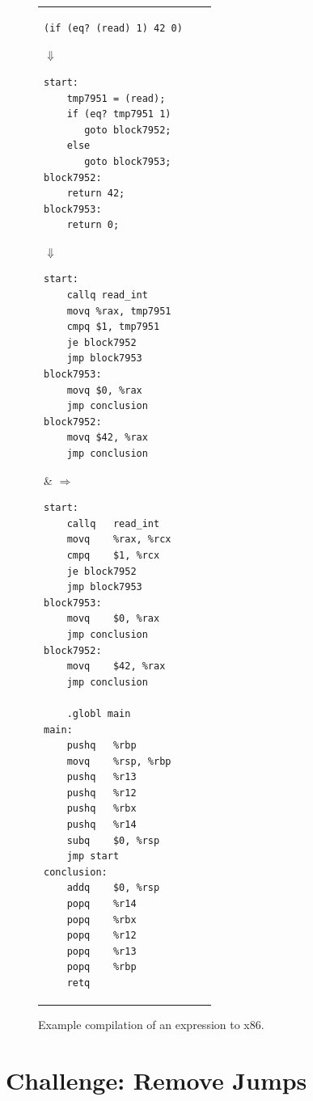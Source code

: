 \documentclass[11pt]{book}
\newcommand{\ocaml}[1]{{\color{blue}{#1}}}
\begin{document}
{\begin{figure}[tbp]
\begin{tabular}{lll}
\begin{minipage}{0.4\textwidth}
\begin{lstlisting}
(if (eq? (read) 1) 42 0)
\end{lstlisting}
$\Downarrow$
\begin{lstlisting}
start:
    tmp7951 = (read);
    if (eq? tmp7951 1)
       goto block7952;
    else
       goto block7953;
block7952:
    return 42;
block7953:
    return 0;
\end{lstlisting}
$\Downarrow$
\begin{lstlisting}
start:
    callq read_int
    movq %rax, tmp7951
    cmpq $1, tmp7951
    je block7952
    jmp block7953
block7953:
    movq $0, %rax
    jmp conclusion
block7952:
    movq $42, %rax
    jmp conclusion
\end{lstlisting}
\end{minipage}
&
$\Rightarrow\qquad$
\begin{minipage}{0.4\textwidth}
\begin{lstlisting}
start:
	callq	read_int
	movq	%rax, %rcx
	cmpq	$1, %rcx
	je block7952
	jmp block7953
block7953:
	movq	$0, %rax
	jmp conclusion
block7952:
	movq	$42, %rax
	jmp conclusion

	.globl main
main:
	pushq	%rbp
	movq	%rsp, %rbp
	pushq	%r13
	pushq	%r12
	pushq	%rbx
	pushq	%r14
	subq	$0, %rsp
	jmp start
conclusion:
	addq	$0, %rsp
	popq	%r14
	popq	%rbx
	popq	%r12
	popq	%r13
	popq	%rbp
	retq
\end{lstlisting}
\end{minipage}
\end{tabular}
\caption{Example compilation of an  expression to x86.\ocaml{(For some reason, all the callee-save registers are being saved, even though they are not used.)}}
\label{fig:if-example-x86}
\end{figure}


\section{Challenge: Remove Jumps}
\label{sec:opt-jumps}

}
\end{document}

